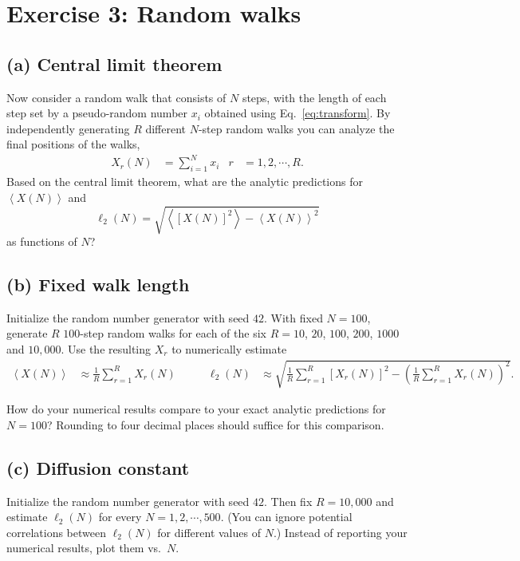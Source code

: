 \documentclass[12 pt]{article} %
\newcommand{\vev}[1]{\ensuremath{\left\langle #1 \right\rangle} }
\newcommand{\eq}[1]{Eq.~\ref{#1}}
\newcommand{\showmarks}[1]{\rightline{\texttt{[#1 marks]}}} %
\begin{document}
\section*{Exercise 3: Random walks}
\subsection*{(a) Central limit theorem}
Now consider a random walk that consists of $N$ steps, with the length of each step set by a pseudo-random number $x_i$ obtained using \eq{eq:transform}.
By independently generating $R$ different $N$-step random walks you can analyze the final positions of the walks,
\begin{align*}
  X_r(N) & = \sum_{i = 1}^N x_i &
  r & = 1, 2, \cdots, R.
\end{align*}
Based on the central limit theorem, what are the analytic predictions for $\vev{X(N)}$ and
\begin{equation*}
  \ell_2(N) = \sqrt{\vev{\left[X(N)\right]^2} - \vev{X(N)}^2}
\end{equation*}
as functions of $N$?

\showmarks{2}

\subsection*{(b) Fixed walk length}
Initialize the random number generator with seed $42$.
With fixed $N = 100$, generate $R$ $100$-step random walks for each of the six $R = 10$, $20$, $100$, $200$, $1000$ and $10{,}000$.
Use the resulting $X_r$ to numerically estimate
\begin{align*}
  \vev{X(N)} & \approx \frac{1}{R} \sum_{r = 1}^R X_r(N) \qquad &
  \ell_2(N) & \approx \sqrt{\frac{1}{R} \sum_{r = 1}^R \left[X_r(N)\right]^2 - \left(\frac{1}{R} \sum_{r = 1}^R X_r(N)\right)^2}.
\end{align*}

How do your numerical results compare to your exact analytic predictions for $N = 100$?
Rounding to four decimal places should suffice for this comparison.

\showmarks{8}

\subsection*{(c) Diffusion constant}
Initialize the random number generator with seed $42$.
Then fix $R = 10{,}000$ and estimate $\ell_2(N)$ for every $N = 1, 2, \cdots, 500$.
(You can ignore potential correlations between $\ell_2(N)$ for different values of $N$.)
Instead of reporting your numerical results, plot them vs.\ $N$.
\end{document}
